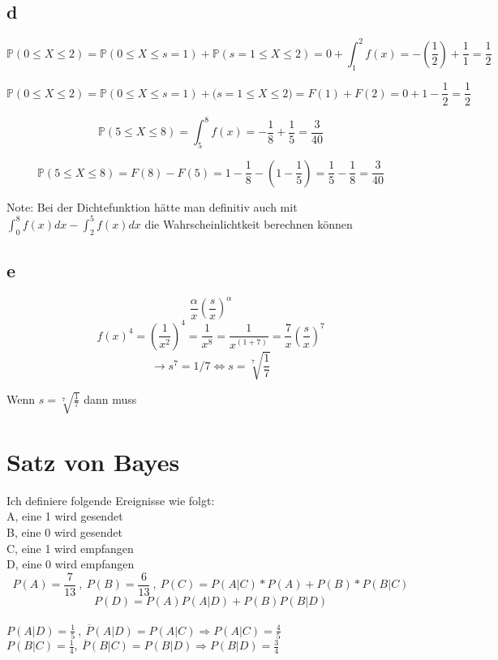\documentclass[]{article}
\begin{document}
\subsection{d}
$$
	\mathbb{P} (0 \leq  X \leq 2) = \mathbb{P}(0 \leq X \leq  s=1 ) + \mathbb{P}( s=1 \leq X \leq 2)	= 0 + \int_{1}^{2} f(x) = - (\frac{1}{2})  + \frac{1}{1} = \frac{1}{2}
$$

$$ 
	\mathbb{P} (0 \leq  X \leq 2) = \mathbb{P}(0 \leq X \leq  s=1 ) + \mathbb( s=1 \leq X \leq 2)	= F(1) + F(2) = 0 +
	1 - \frac{1}{2} = \frac{1}{2}
$$

$$ \mathbb{P} (  5 \leq X \leq 8)  = \int_{5}^{8} f(x) = -\frac{1}{8} +  \frac{1}{5} = \frac{3}{40}  $$

$$ \mathbb{P} ( 5 \leq X \leq 8) = F(8) - F(5) = 1 - \frac{1}{8} - (1 - \frac{1}{5}) = \frac{1}{5} - \frac{1}{8} = \frac{3}{40} $$

Note: Bei der Dichtefunktion hätte man definitiv auch mit $ \int_0^8 f(x) dx - \int_2^5 f(x) dx $ die Wahrscheinlichtkeit berechnen k\"onnen 

\subsection{e}
$$
\frac{\alpha}{x} (\frac{s }{x}) ^ \alpha
$$
$$  f(x) ^4 = ( \frac{1}{x^2} )^4= \frac{1}{x^8} = \frac{1}{x^(1+7)} = \frac{7}{x}  (\frac{s}{x}) ^7    $$ 
$$  \rightarrow  s^7 = 1/7 \Leftrightarrow s = \sqrt[7]{\frac{1}{7}}   $$

Wenn $s = \sqrt[7]{\frac{1}{7}}$ dann muss
\begin{comment}

$$ \int_{\sqrt[7]{\frac{1}{7}}}^{\infty}  \frac{1}{x} (\frac{\sqrt[7]{\frac{1}{7}}{x}v }   dx =  -\frac{1}{\sqrt[7]{7x}} \] $$


\end{comment}
\section{Satz von Bayes}

Ich definiere folgende Ereignisse wie folgt:\\ 
A, eine 1 wird gesendet\\
B, eine 0 wird gesendet\\
C, eine 1 wird empfangen\\
D, eine 0 wird empfangen\\

$$ P(A) = \frac{7}{13}\ ,\ P(B) = \frac{6}{13}\ ,\ P(C) = P(A|C) *P(A) + P(B)* P(B|C)$$ $$P(D) = P(A)P(A|D) +P(B)P(B|D) $$ \\
$ P(A|D) = \frac{1}{5}\ ,\ \overline{P}(A|D) = P(A|C) \Rightarrow P(A| C) = \frac{4}{5} $\\
$P(B|C ) = \frac{1}{4},\  \overline{P}(B|C) = P(B|D) \Rightarrow P(B|D) = \frac{3}{4} $
\end{document}
